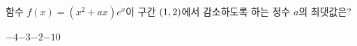 함수 $f(x)=(x^2+ax)e^x$이 구간 $(1{,}\mkern3mu\mathopen{}2)$에서 감소하도록 하는 정수 $a$의 최댓값은?
\begin{choices32}{$-4$}{$-3$}{$-2$}{$-1$}{$0$}\end{choices32}
